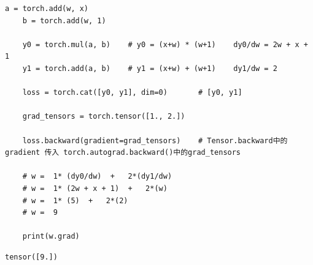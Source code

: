 \begin{enumerate}[label=\arabic*)]
\begin{lstlisting}[style=pythonstyle]
    a = torch.add(w, x)     
    b = torch.add(w, 1)
    
    y0 = torch.mul(a, b)    # y0 = (x+w) * (w+1)    dy0/dw = 2w + x + 1
    y1 = torch.add(a, b)    # y1 = (x+w) + (w+1)    dy1/dw = 2
    
    loss = torch.cat([y0, y1], dim=0)       # [y0, y1]
    
    grad_tensors = torch.tensor([1., 2.])
    
    loss.backward(gradient=grad_tensors)    # Tensor.backward中的 gradient 传入 torch.autograd.backward()中的grad_tensors
    
    # w =  1* (dy0/dw)  +   2*(dy1/dw)
    # w =  1* (2w + x + 1)  +   2*(w)
    # w =  1* (5)  +   2*(2)
    # w =  9
    
    print(w.grad)
    \end{lstlisting}
    \begin{lstlisting}[style=demostyle,numbers=none]
    tensor([9.])
    \end{lstlisting}
\end{enumerate}


